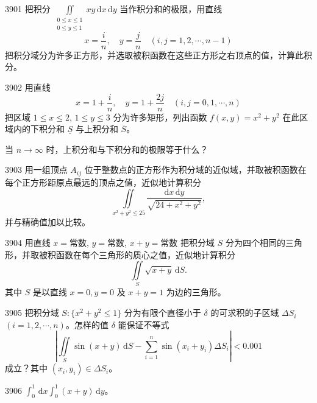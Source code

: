 

\begin{prob}[M]{3901}
把积分 $\iint\limits_{\substack{0 \leqslant x \leqslant 1 \\ 0 \leqslant y \leqslant 1}} xy\,\mathrm{d}x\,\mathrm{d}y$ 当作积分和的极限，用直线
\[
x = \frac{i}{n}, \quad y = \frac{j}{n} \quad (i, j = 1, 2, \cdots, n - 1)
\]
把积分域分为许多正方形，并选取被积函数在这些正方形之右顶点的值，计算此积分。
\end{prob}

\begin{prob}[M]{3902}
用直线
\[
x = 1 + \frac{i}{n}, \quad y = 1 + \frac{2j}{n} \quad (i, j = 0, 1, \cdots, n)
\]
把区域 $1 \leqslant x \leqslant 2$, $1 \leqslant y \leqslant 3$ 分为许多矩形，列出函数 $f(x, y) = x^2 + y^2$ 在此区域内的下积分和 $\underline{S}$ 与上积分和 $\overline{S}$。

当 $n \to \infty$ 时，上积分和与下积分和的极限等于什么？
\end{prob}

\begin{prob}[M]{3903}
用一组顶点 $A_{ij}$ 位于整数点的正方形作为积分域的近似域，并取被积函数在每个正方形距原点最远的顶点之值，近似地计算积分
\[
\iint\limits_{x^2 + y^2 \leqslant 25} \frac{\mathrm{d}x\,\mathrm{d}y}{\sqrt{24 + x^2 + y^2}},
\]
并与精确值加以比较。
\end{prob}

\begin{prob}[M]{3904}
用直线 $x = \text{常数}$, $y = \text{常数}$, $x + y = \text{常数}$ 把积分域 $S$ 分为四个相同的三角形，并取被积函数在每个三角形的质心之值，近似地计算积分
\[
\iint\limits_{S} \sqrt{x + y}\,\mathrm{d}S.
\]
其中 $S$ 是以直线 $x = 0, y = 0$ 及 $x + y = 1$ 为边的三角形。
\end{prob}

\begin{prob}[M]{3905}
把积分域 $S: \{x^2 + y^2 \leqslant 1\}$ 分为有限个直径小于 $\delta$ 的可求积的子区域 $\Delta S_i$ $(i = 1, 2, \cdots, n)$。怎样的值 $\delta$ 能保证不等式
\[
\left| \iint\limits_{S} \sin(x + y)\,\mathrm{d}S - \sum_{i=1}^{n} \sin(x_i + y_i)\Delta S_i \right| < 0.001
\]
成立？其中 $(x_i, y_i) \in \Delta S_i$。
\end{prob}


\begin{prob}[S]{3906}
$\int_{0}^{1}\,\mathrm{d}x \int_{0}^{1} (x + y)\,\mathrm{d}y$。
\end{prob}

